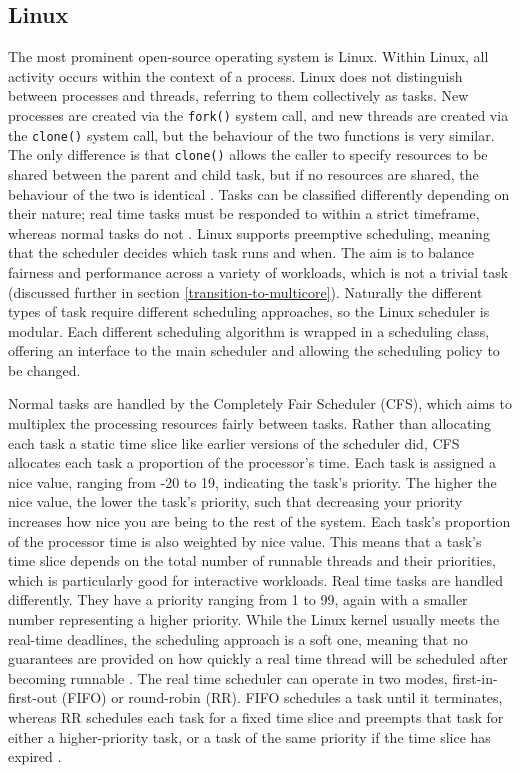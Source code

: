 \documentclass[bsc,frontabs,twoside,singlespacing,parskip,deptreport]{infthesis}     %
\begin{document}
\subsection{Linux}
The most prominent open-source operating system is Linux. Within Linux, all activity occurs within the context of a process. Linux does not distinguish between processes and threads, referring to them collectively as tasks. New processes are created via the \verb|fork()| system call, and new threads are created via the \verb|clone()| system call, but the behaviour of the two functions is very similar. The only difference is that \verb|clone()| allows the caller to specify resources to be shared between the parent and child task, but if no resources are shared, the behaviour of the two is identical \cite{silberschatz}. Tasks can be classified differently depending on their nature; real time tasks must be responded to within a strict timeframe, whereas normal tasks do not \cite{seeker}. Linux supports preemptive scheduling, meaning that the scheduler decides which task runs and when. The aim is to balance fairness and performance across a variety of workloads, which is not a trivial task (discussed further in section \ref{transition-to-multicore}). Naturally the different types of task require different scheduling approaches, so the Linux scheduler is modular. Each different scheduling algorithm is wrapped in a scheduling class, offering an interface to the main scheduler \cite{seeker} and allowing the scheduling policy to be changed. 

Normal tasks are handled by the Completely Fair Scheduler (CFS), which aims to multiplex the processing resources fairly between tasks. Rather than allocating each task a static time slice like earlier versions of the scheduler did, CFS allocates each task a proportion of the processor's time. Each task is assigned a nice value, ranging from -20 to 19, indicating the task's priority. The higher the nice value, the lower the task's priority, such that decreasing your priority increases how nice you are being to the rest of the system. Each task's proportion of the processor time is also weighted by nice value. This means that a task's time slice depends on the total number of runnable threads and their priorities, which is particularly good for interactive workloads. Real time tasks are handled differently. They have a priority ranging from 1 to 99, again with a smaller number representing a higher priority. While the Linux kernel usually meets the real-time deadlines, the scheduling approach is a soft one, meaning that no guarantees are provided on how quickly a real time thread will be scheduled after becoming runnable \cite{silberschatz}. The real time scheduler can operate in two modes, first-in-first-out (FIFO) or round-robin (RR). FIFO schedules a task until it terminates, whereas RR schedules each task for a fixed time slice and preempts that task for either a higher-priority task, or a task of the same priority if the time slice has expired \cite{seeker}.
\end{document}

